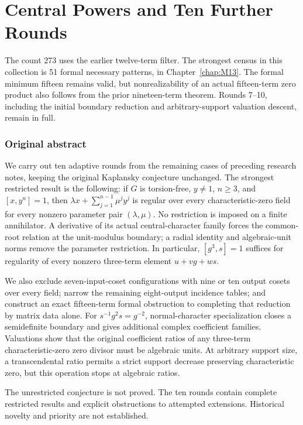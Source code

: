 \documentclass[11pt,a4paper,oneside]{report}
\theoremstyle{definition}
\theoremstyle{remark}
\newcommand{\compilationnote}[1]{\medskip\noindent{\small\color{accent}\textbf{Compilation note --- 23 November 2026.}}\par
{\small #1}\par\medskip}
\begin{document}
\chapter{Central Powers and Ten Further Rounds}\label{chap:M12}
\par
\compilationnote{The count 273 uses the earlier twelve-term filter. The strongest
census in this collection is 51 formal necessary patterns, in
Chapter~\ref{chap:M13}. The formal minimum fifteen remains valid, but
nonrealizability of an actual fifteen-term zero product also follows from
the prior nineteen-term theorem. Rounds 7--10, including the initial
boundary reduction and arbitrary-support valuation descent, remain in full.}
\subsection*{Original abstract}
We carry out ten adaptive rounds from the remaining cases of preceding
research notes, keeping the original Kaplansky conjecture unchanged.
The strongest restricted result is the following: if $G$ is torsion-free,
$y\ne1$, $n\ge3$, and $[x,y^n]=1$, then
$\lambda x+\sum_{j=1}^{n-1}\mu^j y^j$ is regular over every
characteristic-zero field for every nonzero parameter pair
$(\lambda,\mu)$. No restriction is imposed on a finite annihilator.
A derivative of its actual central-character family forces the
common-root relation at the unit-modulus boundary; a radial identity
and algebraic-unit norms remove the parameter restriction.
In particular, $[g^3,s]=1$ suffices for regularity of every nonzero
three-term element $u+vg+ws$.

We also exclude seven-input-coset configurations with nine or ten
output cosets over every field; narrow the remaining eight-output
incidence tables; and construct an exact fifteen-term formal
obstruction to completing that reduction by matrix data alone.
For $s^{-1}g^2s=g^{-2}$, normal-character specialization closes a
semidefinite boundary and gives additional complex coefficient
families. Valuations show that the original coefficient ratios of
any three-term characteristic-zero zero divisor must be algebraic
units. At arbitrary support size, a transcendental ratio permits a
strict support decrease preserving characteristic zero, but this
operation stops at algebraic ratios.

The unrestricted conjecture is not proved. The ten rounds contain
complete restricted results and explicit obstructions to attempted
extensions. Historical novelty and priority are not established.
\medskip
\end{document}
